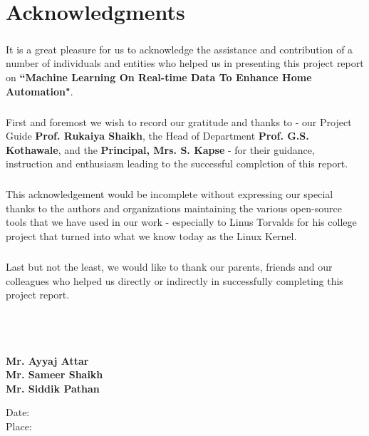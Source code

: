 \chapter*{Acknowledgments}
\thispagestyle{empty}
\paragraph{}
It is a great pleasure for us to acknowledge the assistance and contribution of a number of individuals and entities who helped us in presenting this project report on \textbf{``Machine Learning On Real-time Data To Enhance Home Automation"}.
\paragraph{}
First and foremost we wish to record our gratitude and thanks to - our Project Guide \textbf{Prof. Rukaiya Shaikh}, the Head of Department \textbf{Prof. G.S. Kothawale}, and the \textbf{Principal, Mrs. S. Kapse} - for their guidance, instruction and enthusiasm leading to the successful completion of this report.
\paragraph{}
This acknowledgement would be incomplete without expressing our special thanks to the authors and organizations maintaining the various open-source tools that we have used in our work - especially to Linus Torvalds for his college project that turned into what we know today as the Linux Kernel.
\paragraph{}
Last but not the least, we would like to thank our parents, friends and our colleagues who helped us directly or indirectly in successfully completing this project report.
\\
\\
\\ 
\\
\begin{flushright}
\parbox[t][][l]{0.3\textwidth}{\textbf{Mr. Ayyaj Attar\\Mr. Sameer Shaikh\\Mr. Siddik Pathan\\}}
\end{flushright}
Date:\\
Place:\\
\newpage
